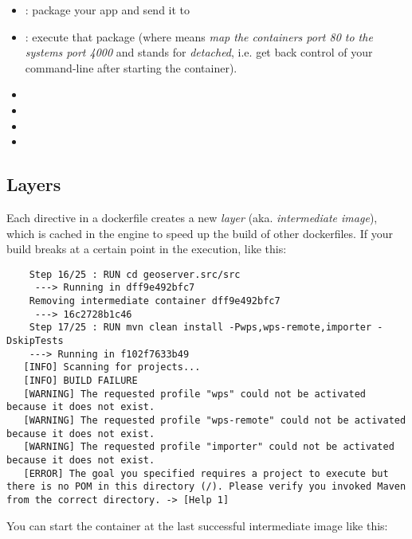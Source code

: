 \begin{itemize}
    \item  {}: package your app and send it to 
    \item {}: execute that package (where  means \emph{map the containers port 80 to the systems port 4000} and  stands for \emph{detached}, i.e. get back control of your command-line after starting the container).
    \item {}
    \item {}
    \item {}
    \item {}
\end{itemize}

\subsection{Layers}
Each directive in a dockerfile creates a new \emph{layer} (aka. \emph{intermediate image}), which is cached in the engine to speed up the build of other dockerfiles. 
If your build breaks at a certain point in the execution, like this: 

\begin{lstlisting}
    Step 16/25 : RUN cd geoserver.src/src
     ---> Running in dff9e492bfc7
    Removing intermediate container dff9e492bfc7
     ---> 16c2728b1c46
    Step 17/25 : RUN mvn clean install -Pwps,wps-remote,importer -DskipTests
    ---> Running in f102f7633b49
   [INFO] Scanning for projects...
   [INFO] BUILD FAILURE
   [WARNING] The requested profile "wps" could not be activated because it does not exist.
   [WARNING] The requested profile "wps-remote" could not be activated because it does not exist.
   [WARNING] The requested profile "importer" could not be activated because it does not exist.
   [ERROR] The goal you specified requires a project to execute but there is no POM in this directory (/). Please verify you invoked Maven from the correct directory. -> [Help 1]
\end{lstlisting}

You can start the container at the last successful intermediate image like this: 

